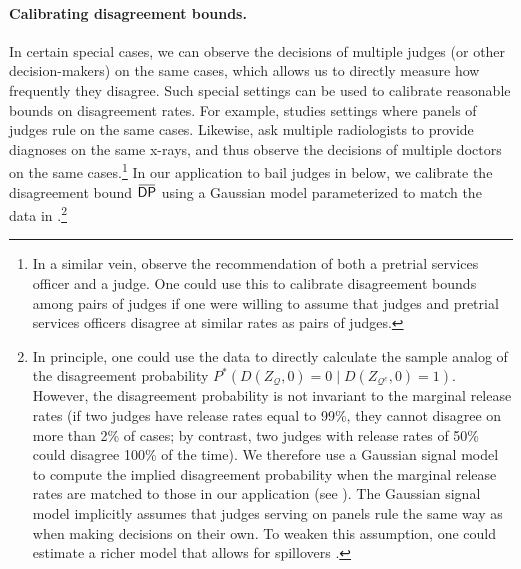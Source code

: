 \documentclass[12pt]{article}%
\theoremstyle{definition}
\newcommand\1{\operatorname{I}\indicatorfence}
\newcommand{\overbar}[1]{\mkern 1.5mu\overline{\mkern-1.5mu#1\mkern-1.5mu}%
  \mkern 1.5mu}%
\newcommand{\DP}{\mathsf{DP}}
\begin{document}
\paragraph{Calibrating disagreement bounds.} In certain special cases, we can observe the decisions of multiple judges (or other decision-makers) on the same cases, which allows us to directly measure how frequently they disagree. Such special settings can be used to calibrate reasonable bounds on disagreement rates. For example, \textcite{sigstad_monotonicity_2023} studies settings where panels of judges rule on the same cases. Likewise, \textcite{agarwal_combining_2023} ask multiple radiologists to provide diagnoses on the same x-rays, and thus observe the decisions of multiple doctors on the same cases.\footnote{In a similar vein, \textcite{ady23} observe the recommendation of both a pretrial services officer and a judge. One could use this to calibrate disagreement bounds among pairs of judges if one were willing to assume that judges and pretrial services officers disagree at similar rates as pairs of judges.} In our application to bail judges in  below, we calibrate the disagreement bound $\overbar{\DP}$ using a Gaussian model parameterized to match the data in \textcite{sigstad_monotonicity_2023}.\footnote{In principle, one could use the
  \textcite{sigstad_monotonicity_2023} data to directly calculate the sample
  analog of the disagreement probability
  $P^*(D(Z_{\mathcal{Q}},0)=0\mid D({Z}_{\mathcal{Q}^{c}},0)=1)$. However, the
  disagreement probability is not invariant to the marginal release rates (if
  two judges have release rates equal to 99\%, they cannot disagree on more
  than 2\% of cases; by contrast, two judges with release rates of 50\% could disagree 100\% of the time). We therefore use a Gaussian signal model to compute the
  implied disagreement probability when the marginal release rates are matched
  to those in our application (see ). The Gaussian signal model implicitly assumes that
  judges serving on panels rule the same way as when making decisions on their
  own. To weaken this assumption, one could estimate a richer model that allows
  for spillovers \parencite[e.g.][]{IaSh12}.}
\end{document}
